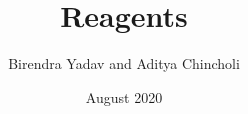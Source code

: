 \documentclass[14pt]{article}
\title{Reagents}
\author{Birendra Yadav and Aditya Chincholi}
\date{August 2020}
\begin{document}
\renewcommand{\familydefault}{\sfdefault}

\maketitle
\pagebreak
\tableofcontents
\pagebreak

\end{document}
